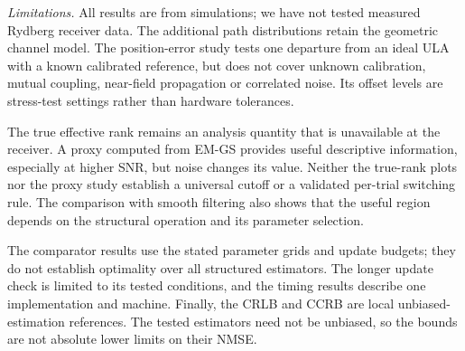 
\textit{Limitations.} All results are from simulations; we have not tested
measured Rydberg receiver data. The additional path distributions retain
the geometric channel model. The position-error study tests one departure
from an ideal ULA with a known calibrated reference, but does not cover
unknown calibration, mutual coupling, near-field propagation or correlated
noise. Its offset levels are stress-test settings rather than hardware
tolerances.

The true effective rank remains an analysis quantity that is unavailable
at the receiver. A proxy computed from EM-GS provides useful descriptive
information, especially at higher SNR, but noise changes its value.
Neither the true-rank plots nor the proxy study establish a universal
cutoff or a validated per-trial switching rule. The comparison with smooth
filtering also shows that the useful region depends on the structural
operation and its parameter selection.

The comparator results use the stated parameter grids and update budgets;
they do not establish optimality over all structured estimators. The longer
update check is limited to its tested conditions, and the timing results
describe one implementation and machine. Finally, the CRLB and CCRB are
local unbiased-estimation references. The tested estimators need not be
unbiased, so the bounds are not absolute lower limits on their NMSE.
